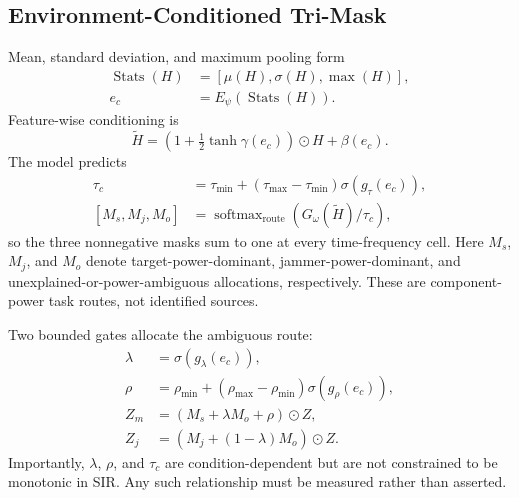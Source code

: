 \documentclass[letterpaper,journal]{IEEEtran}
\newcommand{\softmax}{\operatorname{softmax}}
\newcommand{\stats}{\operatorname{Stats}}
\begin{document}
\subsection{Environment-Conditioned Tri-Mask}
Mean, standard deviation, and maximum pooling form
\begin{align}
\stats(H)&=[\mu(H),\sigma(H),\max(H)],\\
e_c&=E_\psi\!\left(\stats(H)\right).
\end{align}
Feature-wise conditioning is
\begin{equation}
\widetilde H =
\left(1+\tfrac{1}{2}\tanh\gamma(e_c)\right)\odot H+\beta(e_c).
\label{eq:film}
\end{equation}
The model predicts
\begin{align}
\tau_c &= \tau_{\min}+(\tau_{\max}-\tau_{\min})\sigma(g_\tau(e_c)),\\
[M_s,M_j,M_o]&=\softmax_{\mathrm{route}}\!
\left(G_\omega(\widetilde H)/\tau_c\right),
\label{eq:studentmask}
\end{align}
so the three nonnegative masks sum to one at every time-frequency cell.
Here $M_s$, $M_j$, and $M_o$ denote target-power-dominant,
jammer-power-dominant, and unexplained-or-power-ambiguous allocations,
respectively.  These are component-power task routes, not identified sources.

Two bounded gates allocate the ambiguous route:
\begin{align}
\lambda &=\sigma(g_\lambda(e_c)),\\
\rho&=\rho_{\min}+(\rho_{\max}-\rho_{\min})\sigma(g_\rho(e_c)),\\
Z_m&=(M_s+\lambda M_o+\rho)\odot Z,\label{eq:zmod}\\
Z_j&=(M_j+(1-\lambda)M_o)\odot Z.\label{eq:zjam}
\end{align}
Importantly, $\lambda$, $\rho$, and $\tau_c$ are condition-dependent but are
not constrained to be monotonic in SIR.  Any such relationship must be
measured rather than asserted.
\end{document}

